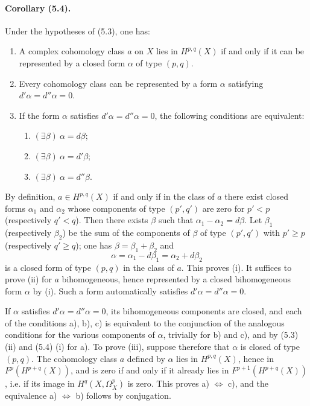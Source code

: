 \documentclass[10pt]{article}
\begin{document}
\paragraph{Corollary (5.4).} Under the hypotheses of (5.3), one has:
\begin{enumerate}[label=(\roman*)]
\item A complex cohomology class $a$ on $X$ lies in $H^{p,q}(X)$ if and only if it can be represented by a closed form $\alpha$ of type $(p,q)$.
\item Every cohomology class can be represented by a form $\alpha$ satisfying $d'\alpha=d''\alpha=0$.
\item If the form $\alpha$ satisfies $d'\alpha=d''\alpha=0$, the following conditions are equivalent:
\begin{enumerate}[label=\alph*)]
\item $(\exists\beta)\ \alpha=d\beta$;
\item $(\exists\beta)\ \alpha=d'\beta$;
\item $(\exists\beta)\ \alpha=d''\beta$.
\end{enumerate}
\end{enumerate}
By definition, $a\in H^{p,q}(X)$ if and only if in the class of $a$ there exist closed forms $\alpha_1$ and $\alpha_2$ whose components of type $(p',q')$ are zero for $p'<p$ (respectively $q'<q$). Then there exists $\beta$ such that $\alpha_1-\alpha_2=d\beta$. Let $\beta_1$ (respectively $\beta_2$) be the sum of the components of $\beta$ of type $(p',q')$ with $p'\ge p$ (respectively $q'\ge q$); one has $\beta=\beta_1+\beta_2$ and
\[
\alpha=\alpha_1-d\beta_1=\alpha_2+d\beta_2
\]
is a closed form of type $(p,q)$ in the class of $a$. This proves (i). It suffices to prove (ii) for $a$ bihomogeneous, hence represented by a closed bihomogeneous form $\alpha$ by (i). Such a form automatically satisfies $d'\alpha=d''\alpha=0$.

If $\alpha$ satisfies $d'\alpha=d''\alpha=0$, its bihomogeneous components are closed, and each of the conditions a), b), c) is equivalent to the conjunction of the analogous conditions for the various components of $\alpha$, trivially for b) and c), and by (5.3) (ii) and (5.4) (i) for a). To prove (iii), suppose therefore that $\alpha$ is closed of type $(p,q)$. The cohomology class $a$ defined by $\alpha$ lies in $H^{p,q}(X)$, hence in $F^p(H^{p+q}(X))$, and is zero if and only if it already lies in $F^{p+1}(H^{p+q}(X))$, i.e. if its image in $H^q(X,\Omega_X^p)$ is zero. This proves a) $\Leftrightarrow$ c), and the equivalence a) $\Leftrightarrow$ b) follows by conjugation.
\end{document}
